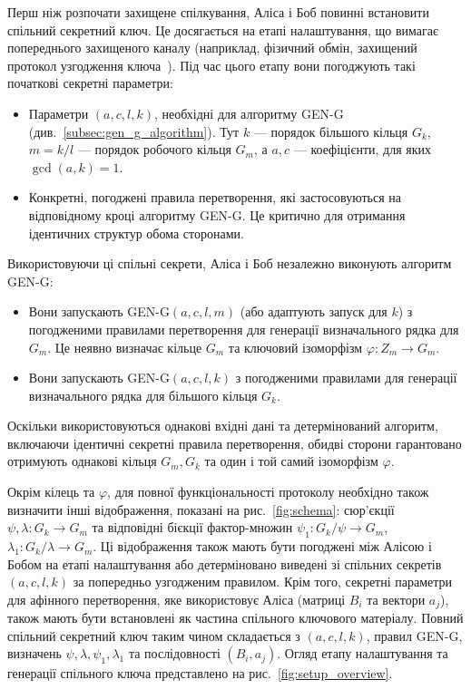 Перш ніж розпочати захищене спілкування, Аліса і Боб повинні встановити спільний секретний ключ.
Це досягається на етапі налаштування, що вимагає попереднього захищеного каналу (наприклад, фізичний обмін, захищений протокол узгодження ключа~\cite{24}).
Під час цього етапу вони погоджують такі початкові секретні параметри:
\begin{itemize}
    \item Параметри $(a, c, l, k)$, необхідні для алгоритму GEN-G (див.~\ref{subsec:gen_g_algorithm}).
    Тут $k$ — порядок більшого кільця $G_k$, $m = k/l$ — порядок робочого кільця $G_m$, а $a, c$ — коефіцієнти, для яких $\gcd(a, k) = 1$.
    \item Конкретні, погоджені правила перетворення, які застосовуються на відповідному кроці алгоритму GEN-G.
    Це критично для отримання ідентичних структур обома сторонами.
\end{itemize}
Використовуючи ці спільні секрети, Аліса і Боб незалежно виконують алгоритм GEN-G:
\begin{itemize}
    \item Вони запускають GEN-G$(a, c, l, m)$ (або адаптують запуск для $k$) з погодженими правилами перетворення для генерації визначального рядка для $G_m$.
    Це неявно визначає кільце $G_m$ та ключовий ізоморфізм $\varphi: Z_m \to G_m$.
    \item Вони запускають GEN-G$(a, c, l, k)$ з погодженими правилами для генерації визначального рядка для більшого кільця $G_k$.
\end{itemize}
Оскільки використовуються однакові вхідні дані та детермінований алгоритм, включаючи ідентичні секретні правила перетворення, обидві сторони гарантовано отримують однакові кільця $G_m, G_k$ та один і той самий ізоморфізм $\varphi$.

Окрім кілець та $\varphi$, для повної функціональності протоколу необхідно також визначити інші відображення, показані на рис.~\ref{fig:schema}: сюр'єкції $\psi, \lambda: G_k \to G_m$ та відповідні бієкції фактор-множин $\psi_1: G_k/\psi \to G_m$, $\lambda_1: G_k/\lambda \to G_m$.
Ці відображення також мають бути погоджені між Алісою і Бобом на етапі налаштування або детерміновано виведені зі спільних секретів $(a,c,l,k)$ за попередньо узгодженим правилом.
Крім того, секретні параметри для афінного перетворення, яке використовує Аліса (матриці $B_i$ та вектори $a_j$), також мають бути встановлені як частина спільного ключового матеріалу.
Повний спільний секретний ключ таким чином складається з $(a,c,l,k)$, правил GEN-G, визначень $\psi, \lambda, \psi_1, \lambda_1$ та послідовності $(B_i, a_j)$. Огляд етапу налаштування та генерації спільного ключа представлено на рис.~\ref{fig:setup_overview}.

